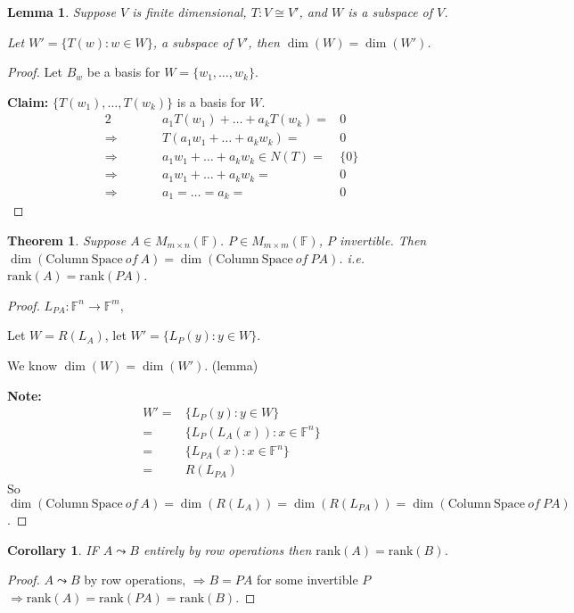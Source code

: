 \documentclass[12pt]{article}
\theoremstyle{plain}
\newtheorem{theorem}{Theorem}[subsection]
\newtheorem{lemma}{Lemma}[subsection]
\newtheorem{corollary}{Corollary}[subsection]
\newcommand{\rank}{\mathrm{rank}}
\newcommand{\ColSpace}{\mathrm{Column \ Space}}
\newcommand{\mF}{{\mathbb{F}}}
\begin{document}
\begin{lemma}
	Suppose $V$ is finite dimensional, $T:V\cong V'$, and $W$ is a subspace of
	$V$. 

	Let $W' = \{T(w) : w \in W\}$, a subspace of $V'$, then $\dim(W) = \dim(W')$.
\end{lemma}
\begin{proof}
	Let $B_w$ be a basis for $W = \{w_1, \ldots, w_k\}$. 

	\textbf{Claim:} $\{T(w_1), \ldots, T(w_k)\}$ is a basis for $W$. 
	\begin{alignat*}{2}
		& & a_1T(w_1) + \ldots + a_kT(w_k) =& 0\\
		\Rightarrow &\qquad & T(a_1w_1 + \ldots + a_kw_k) =& 0\\
		\Rightarrow &\qquad & a_1w_1 + \ldots + a_kw_k \in N(T) =& \{0\} \\
		\Rightarrow &\qquad & a_1w_1 + \ldots + a_kw_k =& 0\\
		\Rightarrow &\qquad & a_1 = \ldots = a_k =& 0
	\end{alignat*}
\end{proof}

\begin{theorem}
	Suppose $A \in M_{m\times n} (\mF)$. $P\in M_{m\times m}(\mF)$, $P$ 
	invertible. Then $\dim(\ColSpace \ of \ A) = \dim(\ColSpace \ of \ PA)$. 
	i.e. $\rank(A) = \rank(PA)$. 
\end{theorem}
\begin{proof}
	$L_{PA} : \mF^n \to \mF^m$,

	Let $W = R(L_A)$, let $W' = \{L_P(y): y \in W\}$. 

	We know $\dim(W) = \dim(W')$. (lemma)
	
	\textbf{Note:} 
	\begin{align*}
		W' =& \{L_P(y) : y \in W\}	\\
		=& \{L_P(L_A(x)): x \in \mF^n\}	\\
		=& \{L_{PA}(x): x \in \mF^n\}	\\
		=& R(L_{PA}) 
	\end{align*}
	So $\dim(\ColSpace \ of \ A) = \dim(R(L_A)) = \dim(R(L_{PA}))
	= \dim(\ColSpace \ of \ PA)$. 
\end{proof}


\begin{corollary}
	IF $A \leadsto B$ entirely by row operations then $\rank(A) = \rank(B)$. 
\end{corollary}
\begin{proof}
	$A \leadsto B$ by row operations, $\Rightarrow B = PA$ for some invertible
	$P$ $\Rightarrow \rank(A) = \rank(PA) = \rank(B)$. 
\end{proof}
\end{document}

